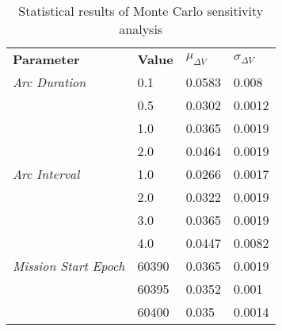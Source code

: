 
                    \begin{table}[]
                    \centering
                    \begin{tabular}{l l l l}
                    \rowcolor[HTML]{EFEFEF} \textbf{Parameter} & \textbf{Value} & \textbf{$\mu_{\Delta V}$} & \textbf{$\sigma_{\Delta V}$} \\
                    \textit{Arc Duration} & 0.1 & 0.0583 & 0.008 \\
 & 0.5 & 0.0302 & 0.0012 \\
 & 1.0 & 0.0365 & 0.0019 \\
 & 2.0 & 0.0464 & 0.0019 \\
\textit{Arc Interval} & 1.0 & 0.0266 & 0.0017 \\
 & 2.0 & 0.0322 & 0.0019 \\
 & 3.0 & 0.0365 & 0.0019 \\
 & 4.0 & 0.0447 & 0.0082 \\
\textit{Mission Start Epoch} & 60390 & 0.0365 & 0.0019 \\
 & 60395 & 0.0352 & 0.001 \\
 & 60400 & 0.035 & 0.0014 \\

                    \end{tabular}
                    \caption{Statistical results of Monte Carlo sensitivity analysis}
                    \label{tab:SensitivityAnalysis}
                    \end{table}
                    